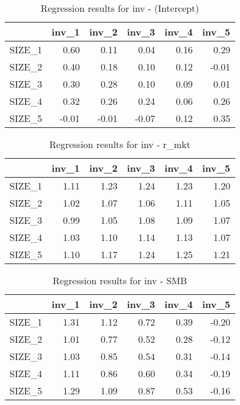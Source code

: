 \begin{table}[ht]
\centering
\caption{Regression results for inv - (Intercept)} 
\begin{tabular}{rrrrrr}
  \hline
 & inv\_1 & inv\_2 & inv\_3 & inv\_4 & inv\_5 \\ 
  \hline
SIZE\_1 & 0.60 & 0.11 & 0.04 & 0.16 & 0.29 \\ 
  SIZE\_2 & 0.40 & 0.18 & 0.10 & 0.12 & -0.01 \\ 
  SIZE\_3 & 0.30 & 0.28 & 0.10 & 0.09 & 0.01 \\ 
  SIZE\_4 & 0.32 & 0.26 & 0.24 & 0.06 & 0.26 \\ 
  SIZE\_5 & -0.01 & -0.01 & -0.07 & 0.12 & 0.35 \\ 
   \hline
\end{tabular}
\end{table}


\begin{table}[ht]
\centering
\caption{Regression results for inv - r_mkt} 
\begin{tabular}{rrrrrr}
  \hline
 & inv\_1 & inv\_2 & inv\_3 & inv\_4 & inv\_5 \\ 
  \hline
SIZE\_1 & 1.11 & 1.23 & 1.24 & 1.23 & 1.20 \\ 
  SIZE\_2 & 1.02 & 1.07 & 1.06 & 1.11 & 1.05 \\ 
  SIZE\_3 & 0.99 & 1.05 & 1.08 & 1.09 & 1.07 \\ 
  SIZE\_4 & 1.03 & 1.10 & 1.14 & 1.13 & 1.07 \\ 
  SIZE\_5 & 1.10 & 1.17 & 1.24 & 1.25 & 1.21 \\ 
   \hline
\end{tabular}
\end{table}


\begin{table}[ht]
\centering
\caption{Regression results for inv - SMB} 
\begin{tabular}{rrrrrr}
  \hline
 & inv\_1 & inv\_2 & inv\_3 & inv\_4 & inv\_5 \\ 
  \hline
SIZE\_1 & 1.31 & 1.12 & 0.72 & 0.39 & -0.20 \\ 
  SIZE\_2 & 1.01 & 0.77 & 0.52 & 0.28 & -0.12 \\ 
  SIZE\_3 & 1.03 & 0.85 & 0.54 & 0.31 & -0.14 \\ 
  SIZE\_4 & 1.11 & 0.86 & 0.60 & 0.34 & -0.19 \\ 
  SIZE\_5 & 1.29 & 1.09 & 0.87 & 0.53 & -0.16 \\ 
   \hline
\end{tabular}
\end{table}


